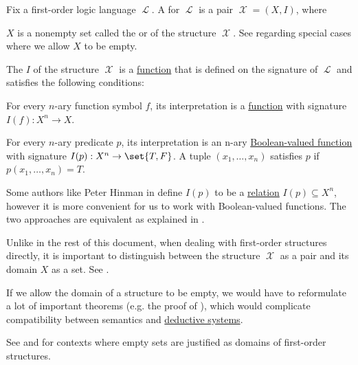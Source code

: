 \begin{definition}\label{def:first_order_structure}
  Fix a first-order logic language \( \mscrL \). A  for \( \mscrL \) is a pair \( \mscrX = (X, I) \), where
  \begin{thmenum}
     \( X \) is a nonempty set called the  or  of the structure \( \mscrX \). See  regarding special cases where we allow \( X \) to be empty.

     The  \( I \) of the structure \( \mscrX \) is a \hyperref[def:function]{function} that is defined on the signature of \( \mscrL \) and satisfies the following conditions:
    \begin{thmenum}
       For every \( n \)-ary function symbol \( f \), its interpretation is a \hyperref[def:function]{function} with signature \( I(f): X^n \to X \).

       For every \( n \)-ary predicate \( p \), its interpretation is an n-ary \hyperref[def:boolean_operator]{Boolean-valued function} with signature \( I(p): X^n \to \set{ T, F } \). A tuple \( (x_1, \ldots, x_n) \) satisfies \( p \) if \( p(x_1, \ldots, x_n) = T \).
    \end{thmenum}
  \end{thmenum}
\end{definition}
\begin{comments}
  \item Some authors like Peter Hinman in \cite[def. 2.1.15(iii)]{Hinman2005} define \( I(p) \) to be a \hyperref[def:relation]{relation} \( I(p) \subseteq X^n \), however it is more convenient for us to work with Boolean-valued functions. The two approaches are equivalent as explained in .
  \item Unlike in the rest of this document, when dealing with first-order structures directly, it is important to distinguish between the structure \( \mscrX \) as a pair and its domain \( X \) as a set. See .
\end{comments}

\begin{remark}\label{rem:empty_first_order_structures}
   If we allow the domain of a structure to be empty, we would have to reformulate a lot of important theorems (e.g. the proof of ), which would complicate compatibility between semantics and \hyperref[def:deductive_system]{deductive systems}.

   See  and  for contexts where empty sets are justified as domains of first-order structures.
\end{remark}

